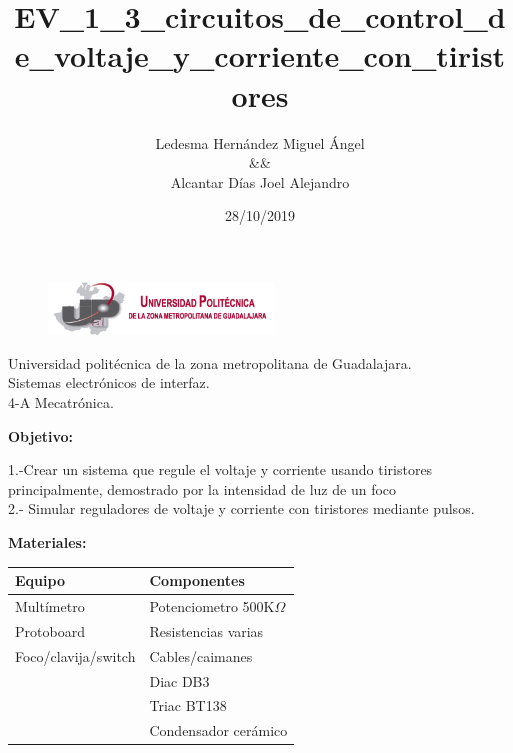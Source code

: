 \documentclass[letterpaper]{article}
\title{EV\_1\_3\_circuitos\_de\_control\_de\_voltaje\_y\_corriente\_con\_tiristores}
\author{Ledesma Hernández Miguel Ángel \\ \&\& \\ Alcantar Días Joel Alejandro}
\date{28/10/2019}
\begin{document}
\begin{figure}[t]
    \includegraphics[width=6cm]{img/logo.png}
\end{figure}
\vspace{2cm}
\maketitle
\vspace{12cm}
\begin{center}
   Universidad politécnica de la zona metropolitana de Guadalajara.\\
Sistemas electrónicos de interfaz.\\
4-A Mecatrónica.\\ 
\end{center}
\newpage

\begin{LARGE}
\textbf{Objetivo:}\\
\end{LARGE}

1.-Crear un sistema que regule el voltaje y corriente usando tiristores principalmente, demostrado por la intensidad de luz de un foco\\
2.- Simular reguladores de voltaje y corriente con tiristores mediante pulsos.

\begin{LARGE}
\textbf{Materiales:}\\
\end{LARGE}

\begin{table}[htbp]
\begin{tabular}{|l|l|}
\hline
{\color[HTML]{3166FF} \textbf{Equipo}} & {\color[HTML]{CB0000} \textbf{Componentes}} \\ \hline
Multímetro                             & Potenciometro 500K$\Omega$                  \\ \hline
Protoboard                             & Resistencias varias                         \\ \hline
Foco/clavija/switch                    & Cables/caimanes                             \\ \hline
                                       & Diac DB3                                    \\ \hline
                                       & Triac BT138                                 \\ \hline
                                       & Condensador cerámico                         \\ \hline
\end{tabular}
\end{table}
\end{document}
